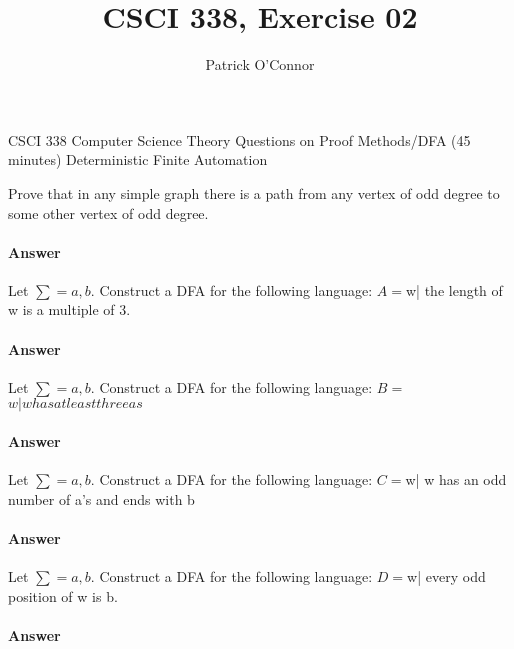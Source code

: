 \documentclass{article}
\title{CSCI 338, Exercise 02}
\author{Patrick O'Connor}
\begin{document}
\maketitle

CSCI 338 Computer Science Theory
Questions on Proof Methods/DFA (45 minutes)
Deterministic Finite Automation

Prove that in any simple graph there is a path from any vertex of odd degree to some
other vertex of odd degree.
\paragraph{Answer}


Let $\sum = {a,b}$. Construct a DFA for the following language:
$A = ${w| the length of w is a multiple of 3}.
\paragraph{Answer}


Let $\sum = {a,b}$. Construct a DFA for the following language:
$B = $${w| w has at least three as}$
\paragraph{Answer}

Let $\sum = {a,b}$. Construct a DFA for the following language:
$C = ${w| w has an odd number of a's and ends with b}
\paragraph{Answer}

Let $\sum = {a,b}$. Construct a DFA for the following language:
$D = ${w| every odd position of w is b}.
\paragraph{Answer}
\end{document}
